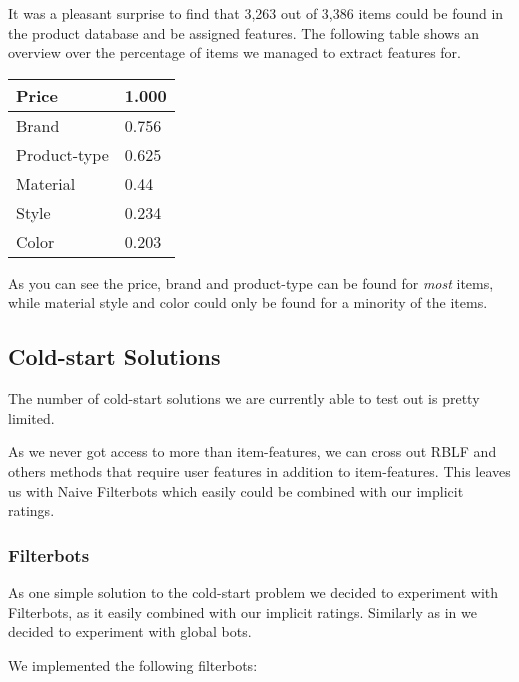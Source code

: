 It was a pleasant surprise to find that 3,263 out of 3,386 items could be found in the
product database and be assigned features. The following table shows an overview over the percentage of items we managed to extract features for.

\begin{table}
\begin{tabular}{|l|l|}
Price 			& 1.000 \\ \hline
Brand 			& 0.756 \\ \hline
Product-type 	& 0.625 \\ \hline
Material 		& 0.44  \\ \hline
Style 			& 0.234 \\ \hline
Color 			& 0.203 \\ \hline
\end{tabular}
\end{table}

As you can see the price, brand and product-type can be found for \emph{most} items, while material style and color could only be found for a minority of the items.



\subsection{Cold-start Solutions}


The number of cold-start solutions we are currently able to test out is pretty limited.

As we never got access to more than item-features, we can cross out RBLF and others 
methods that require user features in addition to item-features. This leaves us with
Naive Filterbots \cite{Park2006} which easily could be combined with our implicit ratings.

\subsubsection{Filterbots}

As one simple solution to the cold-start problem we decided to experiment with Filterbots, as it easily
combined with our implicit ratings. Similarly as in \cite{Park2006} we decided to experiment with global bots.

We implemented the following filterbots:


